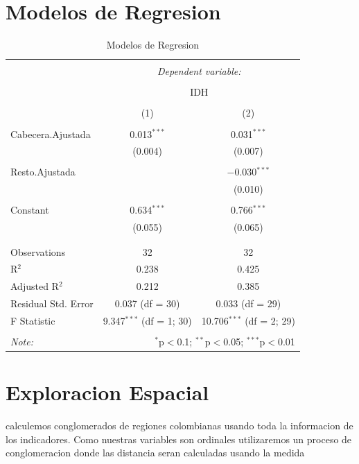 \documentclass{article}
\begin{document}


\clearpage

\section{Modelos de Regresion}






\begin{table}[!htbp] \centering 
  \caption{Modelos de Regresion} 
  \label{regresiones} 
\begin{tabular}{@{\extracolsep{5pt}}lcc} 
\\[-1.8ex]\hline 
\hline \\[-1.8ex] 
 & \multicolumn{2}{c}{\textit{Dependent variable:}} \\ 
\cline{2-3} 
\\[-1.8ex] & \multicolumn{2}{c}{IDH} \\ 
\\[-1.8ex] & (1) & (2)\\ 
\hline \\[-1.8ex] 
 Cabecera.Ajustada & 0.013$^{***}$ & 0.031$^{***}$ \\ 
  & (0.004) & (0.007) \\ 
  & & \\ 
 Resto.Ajustada &  & $-$0.030$^{***}$ \\ 
  &  & (0.010) \\ 
  & & \\ 
 Constant & 0.634$^{***}$ & 0.766$^{***}$ \\ 
  & (0.055) & (0.065) \\ 
  & & \\ 
\hline \\[-1.8ex] 
Observations & 32 & 32 \\ 
R$^{2}$ & 0.238 & 0.425 \\ 
Adjusted R$^{2}$ & 0.212 & 0.385 \\ 
Residual Std. Error & 0.037 (df = 30) & 0.033 (df = 29) \\ 
F Statistic & 9.347$^{***}$ (df = 1; 30) & 10.706$^{***}$ (df = 2; 29) \\ 
\hline 
\hline \\[-1.8ex] 
\textit{Note:}  & \multicolumn{2}{r}{$^{*}$p$<$0.1; $^{**}$p$<$0.05; $^{***}$p$<$0.01} \\ 
\end{tabular} 
\end{table} 



\clearpage


\section{Exploracion Espacial}

 calculemos conglomerados de regiones colombianas usando toda la informacion de los indicadores. Como nuestras variables son ordinales utilizaremos un proceso de conglomeracion donde las distancia seran calculadas usando la medida 
\end{document}

